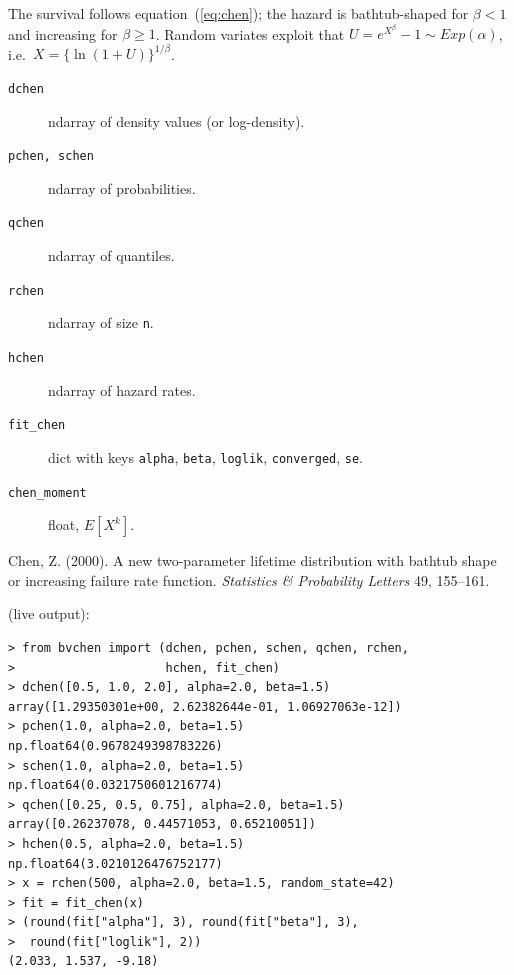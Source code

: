 \documentclass[11pt,a4paper]{article}
\newcommand{\code}[1]{\texttt{#1}}
\newcommand{\DocSec}[1]{%
  \vspace{0.7em}\noindent{\bfseries #1}\par\vspace{0.25em}}
\begin{document}
\DocSec{Details}
The survival follows equation~(\ref{eq:chen});
the hazard is bathtub-shaped for $\beta<1$ and increasing for
$\beta\ge 1$. Random variates exploit that
$U=e^{X^{\beta}}-1\sim Exp(\alpha)$, i.e.\
$X=\{\ln(1+U)\}^{1/\beta}$.
\DocSec{Value}
\begin{description}
\item[\code{dchen}] ndarray of density values (or log-density).
\item[\code{pchen, schen}] ndarray of probabilities.
\item[\code{qchen}] ndarray of quantiles.
\item[\code{rchen}] ndarray of size \code{n}.
\item[\code{hchen}] ndarray of hazard rates.
\item[\code{fit\_chen}] dict with keys \code{alpha}, \code{beta}, \code{loglik}, \code{converged}, \code{se}.
\item[\code{chen\_moment}] float, $E[X^k]$.
\end{description}
\DocSec{References}
Chen, Z. (2000). A new two-parameter lifetime
distribution with bathtub shape or increasing failure rate function.
\emph{Statistics \& Probability Letters} 49, 155--161.

\vspace{0.8em} (live output):
\begin{lstlisting}
> from bvchen import (dchen, pchen, schen, qchen, rchen,
>                     hchen, fit_chen)
> dchen([0.5, 1.0, 2.0], alpha=2.0, beta=1.5)
array([1.29350301e+00, 2.62382644e-01, 1.06927063e-12])
> pchen(1.0, alpha=2.0, beta=1.5)
np.float64(0.9678249398783226)
> schen(1.0, alpha=2.0, beta=1.5)
np.float64(0.0321750601216774)
> qchen([0.25, 0.5, 0.75], alpha=2.0, beta=1.5)
array([0.26237078, 0.44571053, 0.65210051])
> hchen(0.5, alpha=2.0, beta=1.5)
np.float64(3.0210126476752177)
> x = rchen(500, alpha=2.0, beta=1.5, random_state=42)
> fit = fit_chen(x)
> (round(fit["alpha"], 3), round(fit["beta"], 3),
>  round(fit["loglik"], 2))
(2.033, 1.537, -9.18)
\end{lstlisting}
\end{document}
